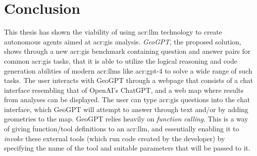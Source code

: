 \chapter{Conclusion}
\label{cha:conclusion}



\begin{comment}
What are the main contributions made to the field?
How significant are these contributions?
Also discuss the contributions in terms of the goals and research questions formulated in the Introduction.

The contributions section will normally contain everything that you address in the abstract, but in an extended form and quite possibly additional issues that cannot be included in the abstract.
An obvious difference is that when the reader has come this far in the text, she/he should be quite familiar with the work, but while reading the abstract they will have little to no knowledge of the work.

The section ``Contributions'' in Chapter~\ref{cha:introduction} differs from this one in that the former is just a list of the main bits, while this section should explain them in more detail.
However, basically the same items should appear in both sections.
\end{comment}

This thesis has shown the viability of using \gls{acr:llm} technology to create autonomous agents aimed at \acrshort{acr:gis} analysis. \textit{GeoGPT}, the proposed solution, shows through a new \acrshort{acr:gis} benchmark containing question and answer pairs for common \acrshort{acr:gis} tasks, that it is able to utilize the logical reasoning and code generation abilities of modern \glspl{acr:llm} like \acrshort{acr:gpt}-4 to solve a wide range of such tasks. The user interacts with GeoGPT through a webpage that consists of a chat interface resembling that of OpenAI's ChatGPT, and a web map where results from analyses can be displayed. The user can type \acrshort{acr:gis} questions into the chat interface, which GeoGPT will attempt to answer through text and/or by adding geometries to the map. GeoGPT relies heavily on \textit{function calling}. This is a way of giving function/tool definitions to an \acrshort{acr:llm}, and essentially enabling it to \textit{invoke} these external tools (which run code created by the developer) by specifying the name of the tool and suitable parameters that will be passed to it.

